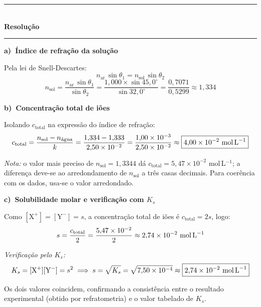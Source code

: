 \documentclass[12pt,a4paper]{article}
\begin{document}
\bigskip\bigskip

\noindent\textcolor{verde}{\rule{\linewidth}{0.5pt}}\\[4pt]
{\textcolor{verde}{\textbf{Resolu\c{c}\~ao}}}\\[-2pt]
\noindent\textcolor{verde}{\rule{\linewidth}{0.5pt}}

\bigskip

\begin{mdframed}[style=resolucao]
\textbf{a)\ \'Indice de refra\c{c}\~ao da solu\c{c}\~ao}

\medskip
Pela lei de Snell-Descartes:
\[
  n_{\text{ar}}\,\sin\theta_1 = n_{\text{sol}}\,\sin\theta_2
\]
\[
  n_{\text{sol}}
  = \frac{n_{\text{ar}}\,\sin\theta_1}{\sin\theta_2}
  = \frac{1{,}000 \times \sin 45{,}0^\circ}{\sin 32{,}0^\circ}
  = \frac{0{,}7071}{0{,}5299}
  \approx \boxed{1{,}334}
\]
\end{mdframed}

\bigskip

\begin{mdframed}[style=resolucao]
\textbf{b)\ Concentra\c{c}\~ao total de i\~oes}

\medskip
Isolando $c_{\text{total}}$ na express\~ao do \'indice de refra\c{c}\~ao:
\[
  c_{\text{total}}
  = \frac{n_{\text{sol}} - n_{\text{\'{a}gua}}}{k}
  = \frac{1{,}334 - 1{,}333}{2{,}50 \times 10^{-2}}
  = \frac{1{,}00 \times 10^{-3}}{2{,}50 \times 10^{-2}}
  \approx \boxed{4{,}00 \times 10^{-2}\ \text{mol\,L}^{-1}}
\]

\smallskip
\textit{Nota:} o valor mais preciso de $n_{\text{sol}} = 1{,}3344$ d\'a
$c_{\text{total}} = 5{,}47 \times 10^{-2}$ mol\,L$^{-1}$; a diferen\c{c}a
deve-se ao arredondamento de $n_{\text{sol}}$ a tr\^es casas decimais.
Para coer\^encia com os dados, usa-se o valor arredondado.
\end{mdframed}

\bigskip

\begin{mdframed}[style=resolucao]
\textbf{c)\ Solubilidade molar e verifica\c{c}\~ao com $K_s$}

\medskip
Como $[\mathrm{X}^+] = [\mathrm{Y}^-] = s$, a concentra\c{c}\~ao total de
i\~oes \'e $c_{\text{total}} = 2s$, logo:
\[
  s = \frac{c_{\text{total}}}{2}
    = \frac{5{,}47 \times 10^{-2}}{2}
    \approx 2{,}74 \times 10^{-2}\ \text{mol\,L}^{-1}
\]

\medskip
\textit{Verifica\c{c}\~ao pelo $K_s$:}
\[
  K_s = [\mathrm{X}^+][\mathrm{Y}^-] = s^2
  \implies
  s = \sqrt{K_s} = \sqrt{7{,}50 \times 10^{-4}}
  \approx \boxed{2{,}74 \times 10^{-2}\ \text{mol\,L}^{-1}}
\]

Os dois valores coincidem, confirmando a consist\^encia entre o resultado
experimental (obtido por refratometria) e o valor tabelado de $K_s$.
\end{mdframed}
\end{document}
